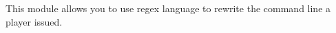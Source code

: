 \label{ch:command_rewrite}

This module allows you to use regex language to rewrite the command line a player issued.
